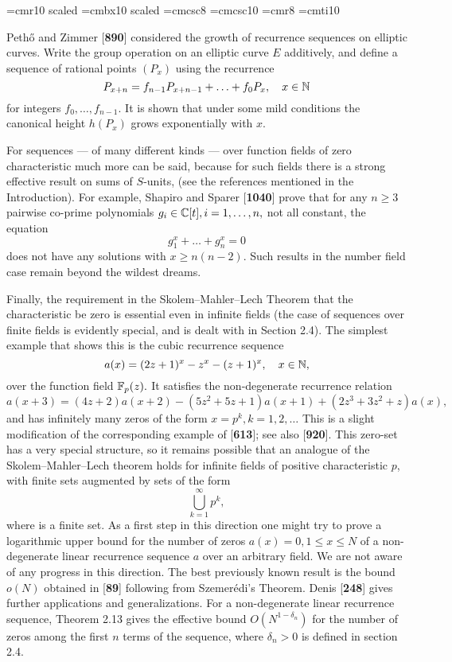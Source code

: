 

\UseAMSsymbols

\hsize=12.5cm
\font\bigletter=cmr10 scaled 
\font\bigbold=cmbx10 scaled 
\font\smallcap=cmcsc8
\font\bigcap=cmcsc10
\font\headl=cmr8
\font\cursive=cmti10
\nopagenumbers

\vskip 0.2cm
Peth\H o and Zimmer [{\bf 890}] considered the growth of recurrence sequences on elliptic curves. Write the group operation on an elliptic curve $E$ additively, and define a sequence of rational points $(P_x)$ using the recurrence
$$P_{x+n}=f_{n-1}P_{x+n-1}+\ldots +f_0P_x,\quad x\in \Bbb{N}$$
for integers $f_0,\ldots ,f_{n-1}.$ It is shown that under some mild conditions the canonical height $h(P_x)$ grows exponentially with $x$.

For sequences --- of many different kinds --- over function fields of zero char\-acteristic much more can be said, because for such fields there is a strong effective result on sums of $S$-units, (see the references mentioned in the Introduction). For example,  Shapiro and Sparer [{\bf 1040}] prove that for any $n \geq 3$ pairwise co-prime polynomials $g_i \in \Bbb{C}[t], i=1,\ldots ,n,$ not all constant, the equation
$$g_1^x+\ldots +g_n^x=0$$
does not have any solutions with $x \geq n(n-2)$. Such results in the number field case remain beyond the wildest dreams.

Finally, the requirement in the Skolem--Mahler--Lech Theorem that the char\-acteristic be zero is essential even in infinite fields (the case of sequences over finite fields is evidently special, and is dealt with in Section 2.4). The simplest example that shows this is the cubic recurrence sequence
$$a(x)=(2z+1)^x-z^x-(z+1)^x,\quad x\in \Bbb{N},$$
over the function field $\Bbb{F}_p(z).$ It satisfies the non-degenerate recurrence relation
$$a(x+3)=(4z+2)a(x+2)-(5z^2+5z+1)a(x+1)+(2z^3+3z^2+z)a(x),$$
and has infinitely many zeros of the form $x=p^k,k=1,2,\ldots$ This is a slight modification of the corresponding example of [{\bf 613}]; see also [{\bf 920}]. This zero-set has a very special structure, so it remains possible that an analogue of the Skolem--Mahler--Lech theorem holds for infinite fields of positive characteristic $p$, with finite sets augmented by sets of the form
$$\bigcup_{k=1}^{\infty}p^k,$$
where is a finite set. As a first step in this direction one might try to prove a logarithmic upper bound for the number of zeros $a(x)=0,1\leq x \leq N$ of a non-degenerate linear recurrence sequence $a$ over an arbitrary field. We are not aware of any progress in this direction. The best previously known result is the bound $o(N)$ obtained in [{\bf 89}] following from Szemer\'edi's Theorem. Denis [{\bf 248}] gives further applications and generalizations. For a non-degenerate linear recurrence sequence, Theorem 2.13 gives the effective bound $O(N^{1-\delta_n})$ for the number of zeros among the first $n$ terms of the sequence, where $\delta_n>0$ is defined in section 2.4.

